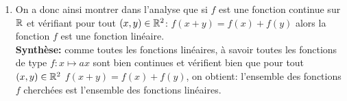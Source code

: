 \documentclass[a4paper, 11pt,reqno]{article}
\begin{document}
\begin{correction}
\begin{enumerate}
		      Ainsi par unicit\'e de la limite, on obtient que: $f(x)=ax$.
		\item On a donc ainsi montrer dans l'analyse que si $f$ est une fonction continue sur $\mathbb{R}$ et v\'erifiant pour tout $(x,y)\in\mathbb{R}^2$: $f(x+y)=f(x)+f(y)$ alors la fonction $f$ est une fonction lin\'eaire.\\
		      \noindent \textbf{Synth\`{e}se:} comme toutes les fonctions lin\'eaires, \`{a} savoir toutes les fonctions de type $f: x\mapsto ax$ sont bien continues et v\'erifient bien que pour tout $(x,y)\in\mathbb{R}^2$ $f(x+y)=f(x)+f(y)$, on obtient: l'ensemble des fonctions $f$ cherch\'ees est l'ensemble des fonctions lin\'eaires.
	\end{enumerate}
\end{correction}
\end{document}
